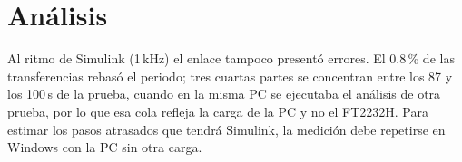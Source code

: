 \section{Análisis}

Al ritmo de Simulink (1\,kHz) el enlace tampoco presentó errores. El
0.8\,\% de las transferencias rebasó el periodo; tres cuartas partes se concentran
entre los 87 y los 100\,s de la prueba, cuando en la misma PC se ejecutaba el
análisis de otra prueba, por lo que esa cola refleja la carga de la PC y no
el FT2232H. Para estimar los pasos atrasados que tendrá Simulink, la
medición debe repetirse en Windows con la PC sin otra carga.
